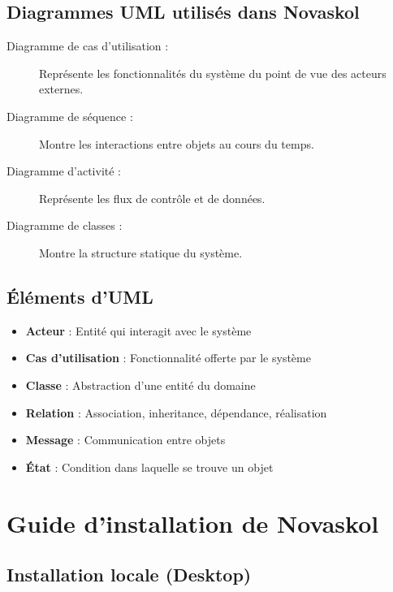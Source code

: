 \documentclass[12pt,a4paper,twoside]{report}
\begin{document}
\section{Diagrammes UML utilisés dans Novaskol}

\begin{description}
    \item[Diagramme de cas d'utilisation :] Représente les fonctionnalités du système du point de vue des acteurs externes.
    \item[Diagramme de séquence :] Montre les interactions entre objets au cours du temps.
    \item[Diagramme d'activité :] Représente les flux de contrôle et de données.
    \item[Diagramme de classes :] Montre la structure statique du système.
\end{description}

\section{Éléments d'UML}

\begin{itemize}
    \item \textbf{Acteur} : Entité qui interagit avec le système
    \item \textbf{Cas d'utilisation} : Fonctionnalité offerte par le système
    \item \textbf{Classe} : Abstraction d'une entité du domaine
    \item \textbf{Relation} : Association, inheritance, dépendance, réalisation
    \item \textbf{Message} : Communication entre objets
    \item \textbf{État} : Condition dans laquelle se trouve un objet
\end{itemize}

\chapter{Guide d'installation de Novaskol}

\section{Installation locale (Desktop)}
\end{document}

